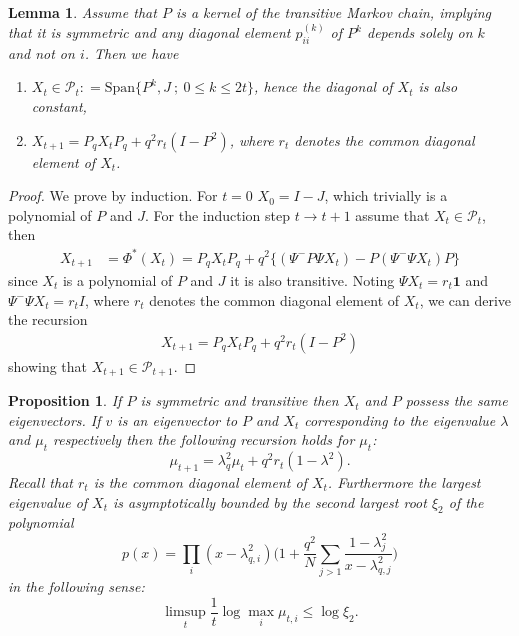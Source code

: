 \documentclass[a4paper,12pt]{article}
\newtheorem{lemma}{Lemma}
\newtheorem{prop}{Proposition}
\begin{document}
\begin{lemma}
	Assume that $P$ is a kernel of the transitive Markov chain, implying that it is symmetric and any diagonal element $p^{(k)}_{ii}$ of $P^k$ depends solely on $k$ and not on $i$.  Then we have
	\begin{enumerate}
		\item $X_t \in \mathcal P_t: =\mathrm{Span}\{P^k, J\ ; \ 0\leq k\leq 2t\}$, hence the diagonal of $X_t$ is also constant,
		\item $X_{t+1} = P_q X_t P_q + q^2 r_t (I-P^2) $,
		where $r_t$ denotes the common diagonal element of $X_t$.
	\end{enumerate} 
\end{lemma}
\begin{proof}
	We prove by induction. For $t=0$ $X_0 = I-J$, which trivially is a polynomial of $P$ and $J$. 
	For the induction step $t\to t+1$ assume that $X_t \in \mathcal P_t$, then
	\begin{align*}
		X_{t+1} &= \Phi^*(X_t) = P_qX_tP_q + q^2\{(\Psi^- P \Psi X_t) - P(\Psi^-\Psi X_t )P\}
	\end{align*} 
	since $X_t$ is a polynomial of $P$ and $J$ it is also transitive. Noting $\Psi X_t = r_t \mathbf 1$ and $\Psi^- \Psi X_t = r_t I$, where $r_t$ denotes the common diagonal element of $X_t$, we can derive the recursion
	\begin{align}\label{trans_rec_matrix}
		X_{t+1} = P_qX_tP_q + q^2 r_t(I-P^2)
	\end{align}
	showing that $X_{t+1} \in \mathcal P_{t+1}$.
\end{proof}
\begin{prop}\label{prop:spec_rate}
	If $P$ is symmetric and transitive then $X_t$ and $P$ possess the same eigenvectors. If $v$ is an eigenvector to $P$ and $  X_t$ corresponding to the eigenvalue $\lambda$ and $\mu_t$ respectively then the following recursion holds for $\mu_t$:
	\begin{equation} \label{trans_rec_ev}  \mu_{t+1} = \lambda_q^2 \mu_t + q^2 r_t (1-\lambda^2). 
	\end{equation}
	Recall that $r_t$ is the common diagonal element of $X_t$.
	Furthermore the largest eigenvalue of $X_t$ is asymptotically bounded by the second largest root $\xi_2$ of the polynomial
	$$ p(x) = \prod_i (x-\lambda_{q,i}^2)\bigg(1+\frac{q^2}N \sum_{j>1} \frac{1-\lambda_j^2}{x-\lambda_{q,j}^2}\bigg) $$
	in the following sense: 
	$$ \limsup_t \frac1t \log \max_i \mu_{t,i} \leq \log \xi_2 . $$
\end{prop}
\end{document}
